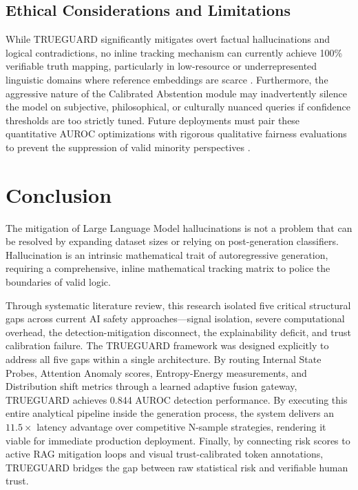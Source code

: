 \documentclass{article}
\begin{document}
\subsection{Ethical Considerations and Limitations}

While TRUEGUARD significantly mitigates overt factual hallucinations and logical contradictions, no inline tracking mechanism can currently achieve 100\% verifiable truth mapping, particularly in low-resource or underrepresented linguistic domains where reference embeddings are scarce \cite{bang2023multitask}. Furthermore, the aggressive nature of the Calibrated Abstention module may inadvertently silence the model on subjective, philosophical, or culturally nuanced queries if confidence thresholds are too strictly tuned. Future deployments must pair these quantitative AUROC optimizations with rigorous qualitative fairness evaluations to prevent the suppression of valid minority perspectives \cite{huang2024trustllm}.

\section{Conclusion}
\label{sec:conclusion}

The mitigation of Large Language Model hallucinations is not a problem that can be resolved by expanding dataset sizes or relying on post-generation classifiers. Hallucination is an intrinsic mathematical trait of autoregressive generation, requiring a comprehensive, inline mathematical tracking matrix to police the boundaries of valid logic.

Through systematic literature review, this research isolated five critical structural gaps across current AI safety approaches---signal isolation, severe computational overhead, the detection-mitigation disconnect, the explainability deficit, and trust calibration failure. The TRUEGUARD framework was designed explicitly to address all five gaps within a single architecture. By routing Internal State Probes, Attention Anomaly scores, Entropy-Energy measurements, and Distribution shift metrics through a learned adaptive fusion gateway, TRUEGUARD achieves 0.844 AUROC detection performance. By executing this entire analytical pipeline inside the generation process, the system delivers an $11.5\times$ latency advantage over competitive N-sample strategies, rendering it viable for immediate production deployment. Finally, by connecting risk scores to active RAG mitigation loops and visual trust-calibrated token annotations, TRUEGUARD bridges the gap between raw statistical risk and verifiable human trust.
\end{document}
